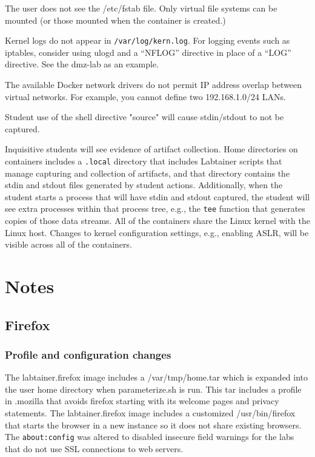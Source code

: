 \documentclass[12pt]{article}
\begin{document}
The user does not see the /etc/fstab file.  Only virtual file systems can be
mounted (or those mounted when the container is created.)

Kernel logs do not appear in {\tt /var/log/kern.log}.  For logging events
such as iptables, consider using ulogd and a ``NFLOG'' directive in place of
a ``LOG'' directive.  See the dmz-lab as an example.

The available Docker network drivers do not permit IP address overlap between virtual networks.
For example, you cannot define two 192.168.1.0/24 LANs.

Student use of the shell directive "source" will cause stdin/stdout to not be captured.

Inquisitive students will see evidence of artifact collection.  Home directories
on containers includes a \texttt{.local} directory that includes Labtainer scripts that manage
capturing and collection of artifacts, and that directory contains the stdin and
stdout files generated by student actions. Additionally, when the student starts a process
that will have stdin and stdout captured, the student will see extra processes within
that process tree, e.g., the \texttt{tee} function that generates copies of those data streams.
All of the containers share the Linux kernel with the Linux host.  Changes to
kernel configuration settings, e.g., enabling ASLR, will be visible across all
of the containers.


\section{Notes} \label{Notes}
\label{Notes}
\subsection{Firefox}
\subsubsection{Profile and configuration changes}
The labtainer.firefox image includes a /var/tmp/home.tar 
which is expanded into the user home directory when parameterize.sh is run.
This tar includes a profile in .mozilla that avoids firefox starting with its 
welcome pages and privacy statements.  The labtainer.firefox image includes a 
customized /usr/bin/firefox that starts the browser in a new instance so it does 
not share existing browsers.  The {\tt about:config}
was altered to disabled insecure field warnings for the labs that do not use SSL connections to web servers.
\end{document}
